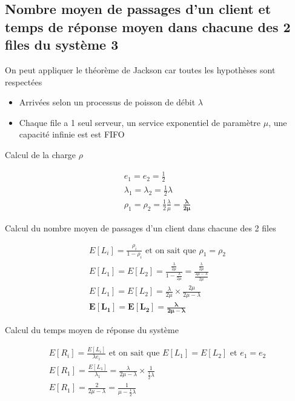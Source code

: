 \documentclass[12pt, a4paper]{article}
\begin{document}
\newpage
\subsection*{Nombre moyen de passages d'un client et temps de réponse moyen dans chacune des 2 files du syst\`eme 3}

On peut appliquer le th\'eor\`eme de Jackson car toutes les hypoth\`eses sont respect\'ees
\begin{itemize}
\item Arriv\'ees selon un processus de poisson de d\'ebit $\lambda$
\item Chaque file a 1 seul serveur, un service exponentiel de param\`etre $\mu$, une capacit\'e infinie est est FIFO
\end{itemize}

\medskip
\quad Calcul de la charge $\rho$ 

\begin{gather*}
e_{1} = e_{2} = \frac{1}{2} \\
\lambda_{1} = \lambda_{2} = \frac{1}{2}\lambda \\
\rho_{1} = \rho_{2} = \frac{1}{2}\frac{\lambda}{\mu} = \bm{\frac{\lambda}{2\mu}}
\end{gather*}

\quad Calcul du nombre moyen de passages d'un client dans chacune des 2 files

\begin{gather*}
E[L_{i}] = \frac{\rho_{i}}{1-\rho_{i}} \text{ et on sait que } \rho_{1}=\rho_{2} \\
E[L_{1}] = E[L_{2}] = \frac{\frac{\lambda}{2\mu}}{1-\frac{\lambda}{2\mu}} = \frac{\frac{\lambda}{2\mu}}{\frac{2\mu - \lambda}{2\mu}} \\
E[L_{1}] = E[L_{2}] = \frac{\lambda}{2\mu}\times\frac{2\mu}{2\mu - \lambda} \\
\bm{E[L_{1}] = E[L_{2}] = \frac{\lambda}{2\mu - \lambda}}
\end{gather*}

\quad Calcul du temps moyen de r\'eponse du syst\`eme

\begin{gather*}
E[R_{i}] = \frac{E[L_{i}]}{\lambda e_{i}} \text{ et on sait que } E[L_{1}] = E[L_{2}] \text{ et } e_{1}=e_{2} \\
E[R_{1}]=\frac{E[L_{1}]}{\lambda_{1}}=\frac{\lambda}{2\mu-\lambda}\times\frac{1}{\frac{1}{2}\lambda} \\
E[R_{1}]=\frac{2}{2\mu-\lambda} = \frac{1}{\mu-\frac{1}{2}\lambda}
\end{gather*}
\end{document}

